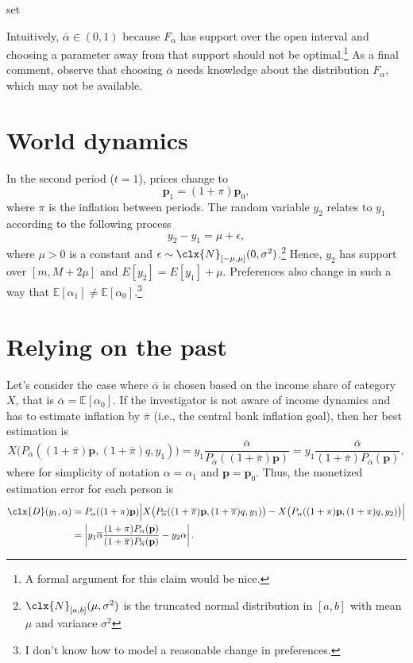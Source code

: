 set\documentclass[english, a4paper,12pt]{article}
\begin{document}
Intuitively, $\overline{\alpha} \in (0,1)$ because $F_{\alpha}$ has support over the open interval and choosing a parameter away from that support should not be optimal.\footnote{A formal argument for this claim would be nice.} As a final comment, observe that choosing $\overline{\alpha}$ needs knowledge about the distribution $F_{\alpha}$, which may not be available.

\section{World dynamics}
In the second period ($t = 1$), prices change to
	$$\mathbf{p}_{1} = (1+\pi)\mathbf{p}_{0},$$
where $\pi$ is the inflation between periods. The random variable $y_{2}$ relates to $y_{1}$ according to the following process
	$$y_{2} - y_{1} = \mu + \epsilon,$$
where $\mu > 0$ is a constant and $\epsilon \sim \clx{N}_{[-\mu, \mu]}(0, \sigma^{2})$.\footnote{$\clx{N}_{[a,b]}(\mu, \sigma^{2})$ is the truncated normal distribution in $[a,b]$ with mean $\mu$ and variance $\sigma^{2}$} Hence, $y_{2}$ has support over $[m,M+2\mu]$ and $E[y_{2}] = E[y_{1}] + \mu$. Preferences also change in such a way that $\mathbb{E}[\alpha_{1}] \neq \mathbb{E}[\alpha_{0}]$.\footnote{I don't know how to model a reasonable change in preferences.}

\section{Relying on the past}
Let's consider the case where $\overline{\alpha}$ is chosen based on the income share of category $X$, that is $\overline{\alpha} = \mathbb{E}[\alpha_{0}]$. If the investigator is not aware of income dynamics and has to estimate inflation by $\overline{\pi}$ (i.e., the central bank inflation goal), then her best estimation is
	$$X\big(P_{\overline{\alpha}}((1+\overline{\pi})\mathbf{p}, (1+\overline{\pi})q, y_{1})\big) 
		= y_{1}\frac{\overline{\alpha}}{P_{\overline{\alpha}}((1+\overline{\pi})\mathbf{p})}
		= y_{1}\frac{\overline{\alpha}}{(1+\overline{\pi})P_{\overline{\alpha}}(\mathbf{p})},
	$$
where for simplicity of notation $\alpha = \alpha_{1}$ and $\mathbf{p} = \mathbf{p}_{0}$. Thus, the monetized estimation error for each person is
	\begin{equation} \label{eq:differencenoincome}
	\begin{aligned}
		\clx{D}(y_{1}, \alpha) 
			&=	P_{\alpha}((1+\pi)\mathbf{p}) \Big| X\big(P_{\overline{\alpha}}((1+\overline{\pi})\mathbf{p}, (1+\overline{\pi})q, y_{1})\big) 
					- X\big(P_{\alpha}((1+\pi)\mathbf{p}, (1+\pi)q, y_{2})\big) \Big|	\\
			&=	\left| y_{1}\overline{\alpha}\frac{(1+\pi)P_{\alpha}(\mathbf{p})}{(1+\overline{\pi})P_{\overline{\alpha}}(\mathbf{p})} 
					- y_{2}\alpha \right|.
	\end{aligned}
	\end{equation}
\end{document}
